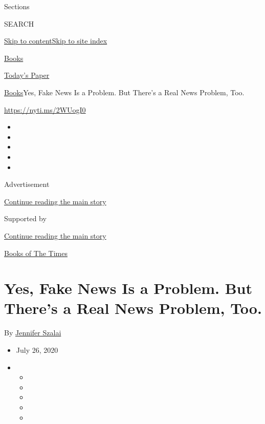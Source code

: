 Sections

SEARCH

\protect\hyperlink{site-content}{Skip to
content}\protect\hyperlink{site-index}{Skip to site index}

\href{https://www.nytimes.com/section/books}{Books}

\href{https://myaccount.nytimes.com/auth/login?response_type=cookie\&client_id=vi}{}

\href{https://www.nytimes.com/section/todayspaper}{Today's Paper}

\href{/section/books}{Books}\textbar{}Yes, Fake News Is a Problem. But
There's a Real News Problem, Too.

\url{https://nyti.ms/2WUogI0}

\begin{itemize}
\item
\item
\item
\item
\item
\end{itemize}

Advertisement

\protect\hyperlink{after-top}{Continue reading the main story}

Supported by

\protect\hyperlink{after-sponsor}{Continue reading the main story}

\href{/column/books-of-the-times}{Books of The Times}

\hypertarget{yes-fake-news-is-a-problem-but-theres-a-real-news-problem-too}{%
\section{Yes, Fake News Is a Problem. But There's a Real News Problem,
Too.}\label{yes-fake-news-is-a-problem-but-theres-a-real-news-problem-too}}

By \href{https://www.nytimes.com/by/jennifer-szalai}{Jennifer Szalai}

\begin{itemize}
\item
  July 26, 2020
\item
  \begin{itemize}
  \item
  \item
  \item
  \item
  \item
  \end{itemize}
\end{itemize}

